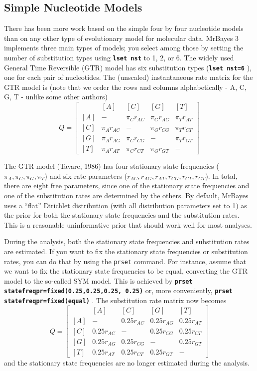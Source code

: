 \documentclass[12pt]{book}
\newcommand{\ttt}[1]{\texttt{#1} }
\newcommand{\tb}[1]{\ttt{\textbf{#1}} }
\begin{document}
\subsection{Simple Nucleotide Models}
There has been more work based on the simple four by four nucleotide models than on any other type
of evolutionary model for molecular data. MrBayes 3 implements three main types of models; you
select among those by setting the number of substitution types using \tb{lset nst} to 1, 2, or 6.
The widely used General Time Reversible (GTR) model has six substitution types (\tb{lset nst=6}),
one for each pair of nucleotides. The (unscaled) instantaneous rate matrix for the GTR model is
(note that we order the rows and columns alphabetically - A, C, G, T - unlike some other authors)
\[ Q=\begin{bmatrix} & [A] & [C] & [G] & [T] \\ [A]& - & \pi_C r_{AC} & \pi_G r_{AG} & \pi_T
r_{AT}\\ [C]& \pi_A r_{AC} & - & \pi_G r_{CG} &\pi_T r_{CT} \\ [G]& \pi_A r_{AG} & \pi_C r_{CG}& -
& \pi_T r_{GT}\\ [T]& \pi_A r_{AT} & \pi_C r_{CT}&\pi_G r_{GT}  & - \end{bmatrix} \]

The GTR model (Tavare, 1986) has four stationary state frequencies ($\pi_A, \pi_C, \pi_G, \pi_T$)
and six rate parameters ($r_{AC}, r_{AG}, r_{AT}, r_{CG}, r_{CT}, r_{GT}$). In total, there are
eight free parameters, since one of the stationary state frequencies and one of the substitution
rates are determined by the others. By default, MrBayes uses a ``flat'' Dirichlet distribution
(with all distribution parameters set to 1) as the prior for both the stationary state frequencies
and the substitution rates.  This is a reasonable uninformative prior that should work well for
most analyses.

During the analysis, both the stationary state frequencies and substitution rates are estimated. If
you want to fix the stationary state frequencies or substitution rates, you can do that by using
the \ttt{prset} command. For instance, assume that we want to fix the stationary state frequencies
to be equal, converting the GTR model to the so-called SYM model. This is achieved by \tb{prset
statefreqpr=fixed(0.25,0.25,0.25, 0.25)} or, more conveniently, \tb{prset
statefreqpr=fixed(equal)}. The substitution rate matrix now becomes \[ Q=\begin{bmatrix} & [A] &
    [C] & [G] & [T] \\ [A]& - & 0.25 r_{AC} & 0.25 r_{AG} & 0.25 r_{AT}\\ [C]& 0.25 r_{AC} & - &
0.25 r_{CG} &0.25 r_{CT} \\ [G]& 0.25 r_{AG} & 0.25 r_{CG}& - & 0.25 r_{GT}\\ [T]& 0.25 r_{AT} &
0.25 r_{CT}&0.25 r_{GT}  & - \end{bmatrix} \] and the stationary state frequencies are no longer
estimated during the analysis.
\end{document}
